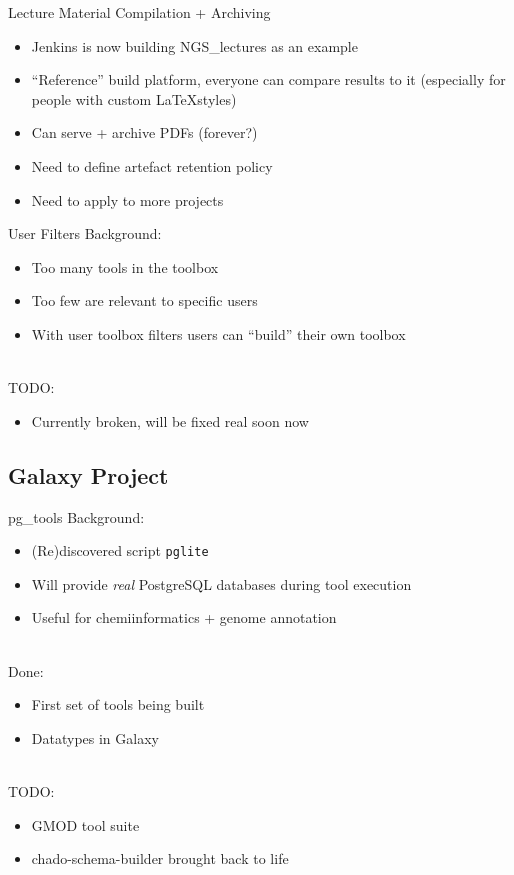 \documentclass[12pt]{ufrslides}
\begin{document}
	\begin{frame}{Lecture Material Compilation + Archiving}
		\begin{itemize}
			\item Jenkins is now building NGS\_lectures as an example
			\item ``Reference'' build platform, everyone can compare results to
				it (especially for people with custom \LaTeX styles)
			\item Can serve + archive PDFs (forever?)
			\item Need to define artefact retention policy
			\item Need to apply to more projects
		\end{itemize}
	\end{frame}

	\begin{frame}{User Filters}
		Background:
		\begin{itemize}
			\item Too many tools in the toolbox
			\item Too few are relevant to specific users
			\item With user toolbox filters users can ``build'' their own toolbox
		\end{itemize}
		\ \\[0.5cm]
		TODO:
		\begin{itemize}
			\item Currently broken, will be fixed real soon now\texttrademark
		\end{itemize}
	\end{frame}

\subsection{Galaxy Project}

	\begin{frame}{pg\_tools}
		Background:
		\begin{itemize}
			\item (Re)discovered script \texttt{pglite}
			\item Will provide \emph{real} PostgreSQL databases during tool execution
			\item Useful for chemiinformatics + genome annotation
		\end{itemize}
		\ \\[0.5cm]
		Done:
		\begin{itemize}
			\item First set of tools being built
			\item Datatypes in Galaxy
		\end{itemize}
		\ \\[0.5cm]
		TODO:
		\begin{itemize}
			\item GMOD tool suite
			\item chado-schema-builder brought back to life
		\end{itemize}
	\end{frame}
\end{document}
